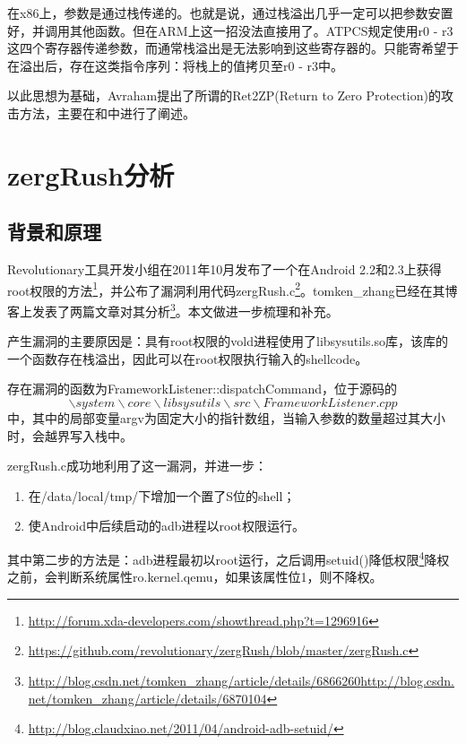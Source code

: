 在x86上，参数是通过栈传递的。也就是说，通过栈溢出几乎一定可以把参数安置好，并调用其他函数。但在ARM上这一招没法直接用了。ATPCS规定使用r0 - r3这四个寄存器传递参数，而通常栈溢出是无法影响到这些寄存器的。只能寄希望于在溢出后，存在这类指令序列：将栈上的值拷贝至r0 - r3中。

以此思想为基础，Avraham提出了所谓的Ret2ZP(Return to Zero Protection)的攻击方法，主要在\cite{arm_stack_exploitation}和\cite{arm_exploitation}中进行了阐述。

\section{zergRush分析}
\subsection{背景和原理}
Revolutionary工具开发小组在2011年10月发布了一个在Android 2.2和2.3上获得root权限的方法\footnote{\href{http://forum.xda-developers.com/showthread.php?t=1296916}{http://forum.xda-developers.com/showthread.php?t=1296916}}，并公布了漏洞利用代码zergRush.c\footnote{\href{https://github.com/revolutionary/zergRush/blob/master/zergRush.c}{https://github.com/revolutionary/zergRush/blob/master/zergRush.c}}。tomken\_zhang已经在其博客上发表了两篇文章对其分析\footnote{\href{http://blog.csdn.net/tomken\_zhang/article/details/6866260}{http://blog.csdn.net/tomken\_zhang/article/details/6866260}\newline\href{http://blog.csdn.net/tomken\_zhang/article/details/6870104}{http://blog.csdn.net/tomken\_zhang/article/details/6870104}}。本文做进一步梳理和补充。

产生漏洞的主要原因是：具有root权限的vold进程使用了libsysutils.so库，该库的一个函数存在栈溢出，因此可以在root权限执行输入的shellcode。

存在漏洞的函数为FrameworkListener::dispatchCommand，位于源码的$$\backslash system\backslash core\backslash libsysutils\backslash src\backslash FrameworkListener.cpp$$中，其中的局部变量argv为固定大小的指针数组，当输入参数的数量超过其大小时，会越界写入栈中。

zergRush.c成功地利用了这一漏洞，并进一步：
\begin{enumerate}
\item 在/data/local/tmp/下增加一个置了S位的shell；
\item 使Android中后续启动的adb进程以root权限运行。
\end{enumerate}

其中第二步的方法是：adb进程最初以root运行，之后调用setuid()降低权限\footnote{\href{http://blog.claudxiao.net/2011/04/android-adb-setuid/}{http://blog.claudxiao.net/2011/04/android-adb-setuid/}}降权之前，会判断系统属性ro.kernel.qemu，如果该属性位1，则不降权。

